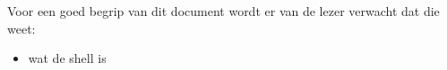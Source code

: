 Voor een goed begrip van dit document wordt er van de lezer verwacht dat die weet:
\begin{itemize}
\item wat de shell is
\end{itemize}
